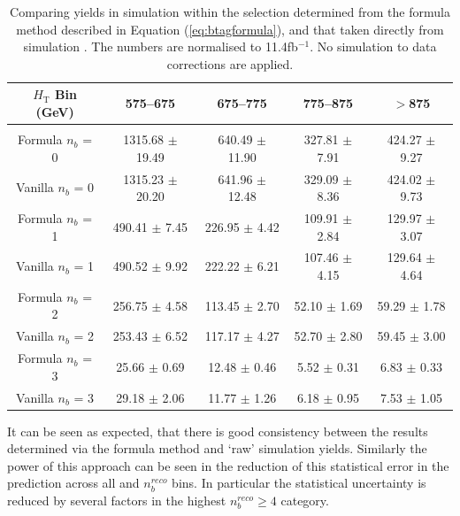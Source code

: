 \begin{table}[ht!]
\begin{center}
\begin{tabular*}{0.95\textwidth}{@{\extracolsep{\fill}}ccccc}
\\
\hline
$H_{\textrm{T}}$ Bin (GeV)         & 575--675                  & 675--775                  & 775--875                  & $>$875                   \\ 
\hline\hline
\\
Formula $n_{b}$ = 0                & 1315.68  $\pm$  19.49     & 640.49  $\pm$  11.90      & 327.81  $\pm$  7.91       & 424.27  $\pm$  9.27      \\
Vanilla $n_{b}$ = 0                & 1315.23  $\pm$  20.20     & 641.96  $\pm$  12.48      & 329.09  $\pm$  8.36       & 424.02  $\pm$  9.73      \\
\hline
Formula $n_{b}$ = 1                & 490.41  $\pm$  7.45       & 226.95  $\pm$  4.42       & 109.91  $\pm$  2.84       & 129.97  $\pm$  3.07      \\
Vanilla $n_{b}$ = 1                & 490.52  $\pm$  9.92       & 222.22  $\pm$  6.21       & 107.46  $\pm$  4.15       & 129.64  $\pm$  4.64      \\
\hline
Formula $n_{b}$ = 2                & 256.75  $\pm$  4.58       & 113.45  $\pm$  2.70       & 52.10  $\pm$  1.69        & 59.29  $\pm$  1.78       \\
Vanilla $n_{b}$ = 2                  & 253.43  $\pm$  6.52       & 117.17  $\pm$  4.27       & 52.70  $\pm$  2.80        & 59.45  $\pm$  3.00       \\
\hline
Formula $n_{b}$ = 3                  & 25.66  $\pm$  0.69        & 12.48  $\pm$  0.46        & 5.52  $\pm$  0.31         & 6.83  $\pm$  0.33        \\
Vanilla $n_{b}$ = 3                  & 29.18  $\pm$  2.06        & 11.77  $\pm$  1.26        & 6.18  $\pm$  0.95         & 7.53  $\pm$  1.05        \\ 
\end{tabular*}
\end{center}
\caption[Comparing yields in simulation within the \mupjets selection determined from the formula method described in Equation (\ref{eq:btagformula}), and that taken directly from simulation . ]{Comparing yields in simulation within the \mupjets selection determined from the formula method described in Equation (\ref{eq:btagformula}), and that taken directly from simulation . The numbers are normalised to 11.4fb$^{-1}$. No simulation to data corrections are applied.}\label{tab:sanitycheck}
\end{table}

It can be seen as expected, that there is good consistency between the results determined via the formula method and `raw' simulation yields. Similarly the power of this approach can be seen in the reduction of this statistical error in the prediction across all \theht and $n_{b}^{reco}$ bins. In particular the statistical uncertainty is reduced by several factors in the highest $n_{b}^{reco} \geq 4$ category.

